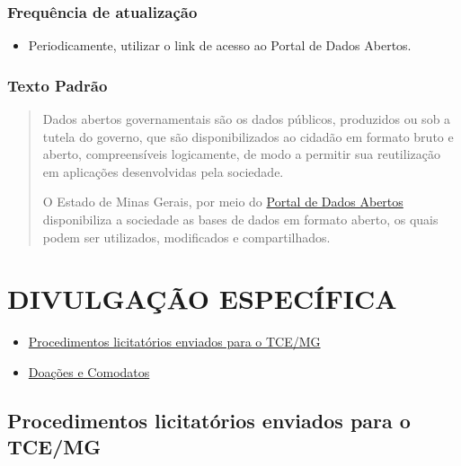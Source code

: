 \documentclass[]{book}
\providecommand{\tightlist}{%
  \setlength{\itemsep}{0pt}\setlength{\parskip}{0pt}}
\begin{document}
\hypertarget{frequuxeancia-de-atualizauxe7uxe3o-9}{%
\subsection{Frequência de atualização}\label{frequuxeancia-de-atualizauxe7uxe3o-9}}

\begin{itemize}
\tightlist
\item
  Periodicamente, utilizar o link de acesso ao Portal de Dados Abertos.
\end{itemize}

\hypertarget{texto-padruxe3o-10}{%
\subsection{Texto Padrão}\label{texto-padruxe3o-10}}

\begin{quote}
Dados abertos governamentais são os dados públicos, produzidos ou sob a tutela do governo, que são disponibilizados ao cidadão em formato bruto e aberto, compreensíveis logicamente, de modo a permitir sua reutilização em aplicações desenvolvidas pela sociedade.

O Estado de Minas Gerais, por meio do \href{http://dados.mg.gov.br/}{Portal de Dados Abertos} disponibiliza a sociedade as bases de dados em formato aberto, os quais podem ser utilizados, modificados e compartilhados.
\end{quote}

\hypertarget{divulgauxe7uxe3o-especuxedfica}{%
\chapter{DIVULGAÇÃO ESPECÍFICA}\label{divulgauxe7uxe3o-especuxedfica}}

\begin{itemize}
\tightlist
\item
  \href{tce.html}{Procedimentos licitatórios enviados para o TCE/MG}
\item
  \href{doacoes.html}{Doações e Comodatos}
\end{itemize}

\hypertarget{procedimentos-licitatuxf3rios-enviados-para-o-tcemg}{%
\section{Procedimentos licitatórios enviados para o TCE/MG}\label{procedimentos-licitatuxf3rios-enviados-para-o-tcemg}}
\end{document}
